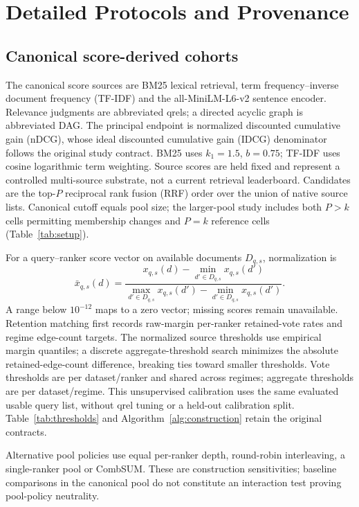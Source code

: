 \documentclass[pdflatex,sn-basic,Numbered]{sn-jnl}
\begin{document}
\section{Detailed Protocols and Provenance}\label{sec:si-protocols}
\subsection{Canonical score-derived cohorts}
The canonical score sources are BM25 lexical retrieval, term frequency--inverse document frequency (TF-IDF) and the all-MiniLM-L6-v2 sentence encoder. Relevance judgments are abbreviated qrels; a directed acyclic graph is abbreviated DAG. The principal endpoint is normalized discounted cumulative gain (nDCG), whose ideal discounted cumulative gain (IDCG) denominator follows the original study contract. BM25 uses $k_1=1.5$, $b=0.75$; TF-IDF uses cosine logarithmic term weighting. Source scores are held fixed and represent a controlled multi-source substrate, not a current retrieval leaderboard. Candidates are the top-$P$ reciprocal rank fusion (RRF) order over the union of native source lists. Canonical cutoff equals pool size; the larger-pool study includes both $P>k$ cells permitting membership changes and $P=k$ reference cells (Table~\ref{tab:setup}).


For a query--ranker score vector on available documents $D_{q,s}$, normalization is
\begin{equation}
\bar x_{q,s}(d)=\frac{x_{q,s}(d)-\min_{d'\in D_{q,s}}x_{q,s}(d')}
{\max_{d'\in D_{q,s}}x_{q,s}(d')-\min_{d'\in D_{q,s}}x_{q,s}(d')}.
\label{eq:si-minmax}
\end{equation}
A range below $10^{-12}$ maps to a zero vector; missing scores remain unavailable. Retention matching first records raw-margin per-ranker retained-vote rates and regime edge-count targets. The normalized source thresholds use empirical margin quantiles; a discrete aggregate-threshold search minimizes the absolute retained-edge-count difference, breaking ties toward smaller thresholds. Vote thresholds are per dataset/ranker and shared across regimes; aggregate thresholds are per dataset/regime. This unsupervised calibration uses the same evaluated usable query list, without qrel tuning or a held-out calibration split. Table~\ref{tab:thresholds} and Algorithm~\ref{alg:construction} retain the original contracts.



Alternative pool policies use equal per-ranker depth, round-robin interleaving, a single-ranker pool or CombSUM. These are construction sensitivities; baseline comparisons in the canonical pool do not constitute an interaction test proving pool-policy neutrality.
\end{document}
